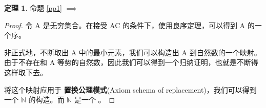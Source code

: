 \documentclass{ctexart}
\theoremstyle{definition}
\newtheorem{theorem}{定理}[section]
\begin{document}
\begin{theorem}
  命题 \ref{pp1} $\implies$ 
\end{theorem}

\begin{proof}
  令 A 是无穷集合。在接受 AC 的条件下，使用良序定理，可以得到 A 的一个序。

  非正式地，不断取出 A 中的最小元素，我们可以构造出 A 到自然数的一个映射。由于不存在和 A 等势的自然数，因此我们可以得到一个归纳证明，也就是不断得这样取下去。

  将这个映射应用于 \textbf{置换公理模式}(Axiom schema of replacement)，我们可以得到一个 $\mathbb{N}$ 的构造。而 $\mathbb{N}$ 是一个 。
\end{proof}
\end{document}
